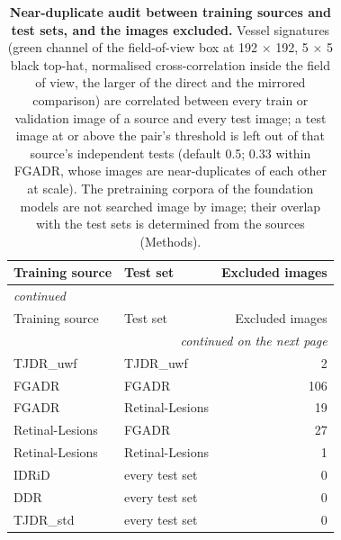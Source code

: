 
{\scriptsize\setlength{\tabcolsep}{3.2pt}\setlength{\LTcapwidth}{\textwidth}\renewcommand{\arraystretch}{1.08}
\begin{longtable}{l l r}
\caption{\textbf{Near-duplicate audit between training sources and test sets, and the images excluded.} Vessel signatures (green channel of the field-of-view box at 192 $\times$ 192, 5 $\times$ 5 black top-hat, normalised cross-correlation inside the field of view, the larger of the direct and the mirrored comparison) are correlated between every train or validation image of a source and every test image; a test image at or above the pair's threshold is left out of that source's independent tests (default 0.5; 0.33 within FGADR, whose images are near-duplicates of each other at scale). The pretraining corpora of the foundation models are not searched image by image; their overlap with the test sets is determined from the sources (Methods).}\label{stab:leaks}\\
\toprule
Training source & Test set & Excluded images \\
\midrule
\endfirsthead
\multicolumn{3}{l}{\textit{continued}}\\
\toprule
Training source & Test set & Excluded images \\
\midrule
\endhead
\midrule
\multicolumn{3}{r}{\textit{continued on the next page}}\\
\endfoot
\bottomrule
\endlastfoot
TJDR\_uwf & TJDR\_uwf & 2 \\
FGADR & FGADR & 106 \\
FGADR & Retinal-Lesions & 19 \\
Retinal-Lesions & FGADR & 27 \\
Retinal-Lesions & Retinal-Lesions & 1 \\
IDRiD & every test set & 0 \\
DDR & every test set & 0 \\
TJDR\_std & every test set & 0 \\
\end{longtable}
}
\vspace{-6pt}
